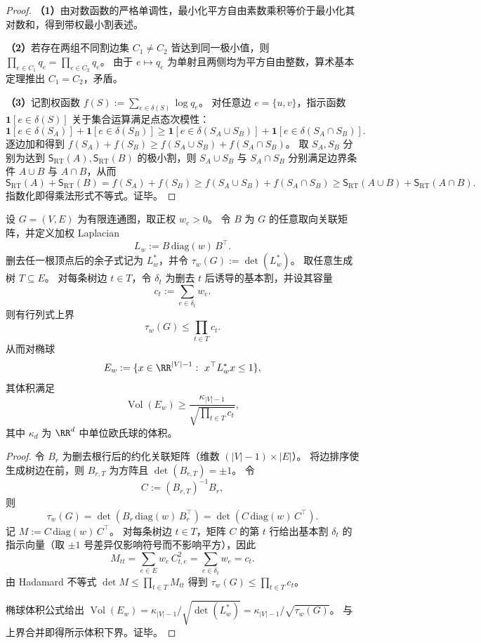 \begin{proof}
\textbf{（1）}由对数函数的严格单调性，最小化平方自由素数乘积等价于最小化其对数和，得到带权最小割表述。
\par
\textbf{（2）}若存在两组不同割边集 \(C_1\neq C_2\) 皆达到同一极小值，则
\(
\prod_{e\in C_1}q_e=\prod_{e\in C_2}q_e
\)。
由于 \(e\mapsto q_e\) 为单射且两侧均为平方自由整数，算术基本定理推出 \(C_1=C_2\)，矛盾。
\par
\textbf{（3）}记割权函数
\(
f(S):=\sum_{e\in\delta(S)}\log q_e
\)。
对任意边 \(e=\{u,v\}\)，指示函数 \(\mathbf 1[e\in\delta(S)]\) 关于集合运算满足点态次模性：
\[
\mathbf 1[e\in\delta(S_A)]+\mathbf 1[e\in\delta(S_B)]
\ge
\mathbf 1[e\in\delta(S_A\cup S_B)]+\mathbf 1[e\in\delta(S_A\cap S_B)].
\]
逐边加和得到 \(f(S_A)+f(S_B)\ge f(S_A\cup S_B)+f(S_A\cap S_B)\)。
取 \(S_A,S_B\) 分别为达到 \(\mathsf S_{\mathrm{RT}}(A),\mathsf S_{\mathrm{RT}}(B)\) 的极小割，则 \(S_A\cup S_B\) 与 \(S_A\cap S_B\) 分别满足边界条件 \(A\cup B\) 与 \(A\cap B\)，从而
\[
\mathsf S_{\mathrm{RT}}(A)+\mathsf S_{\mathrm{RT}}(B)
=f(S_A)+f(S_B)
\ge f(S_A\cup S_B)+f(S_A\cap S_B)
\ge \mathsf S_{\mathrm{RT}}(A\cup B)+\mathsf S_{\mathrm{RT}}(A\cap B).
\]
指数化即得乘法形式不等式。证毕。
\end{proof}

\begin{proposition}\label{prop:spg-kirchhoff-fundamental-cut-capacity-hadamard}
设 \(G=(V,E)\) 为有限连通图，取正权 \(w_e>0\)。
令 \(B\) 为 \(G\) 的任意取向关联矩阵，并定义加权 Laplacian
\[
L_w:=B\,\mathrm{diag}(w)\,B^\top .
\]
删去任一根顶点后的余子式记为 \(L_w^\ast\)，并令
\(
\tau_w(G):=\det(L_w^\ast)
\)。
取任意生成树 \(T\subseteq E\)。
对每条树边 \(t\in T\)，令 \(\delta_t\) 为删去 \(t\) 后诱导的基本割，并设其容量
\[
c_t:=\sum_{e\in\delta_t} w_e.
\]
则有行列式上界
\[
\tau_w(G)\le \prod_{t\in T} c_t.
\]
从而对椭球
\[
E_w:=\{x\in\RR^{|V|-1}:\ x^\top L_w^\ast x\le 1\},
\]
其体积满足
\[
\operatorname{Vol}(E_w)\ge \frac{\kappa_{|V|-1}}{\sqrt{\prod_{t\in T} c_t}},
\]
其中 \(\kappa_d\) 为 \(\RR^d\) 中单位欧氏球的体积。
\end{proposition}
\begin{proof}
令 \(B_r\) 为删去根行后的约化关联矩阵（维数 \((|V|-1)\times |E|\)）。
将边排序使生成树边在前，则 \(B_{r,T}\) 为方阵且 \(\det(B_{r,T})=\pm1\)。
令
\[
C:=(B_{r,T})^{-1}B_r,
\]
则
\[
\tau_w(G)=\det(B_r\,\mathrm{diag}(w)\,B_r^\top)=\det(C\,\mathrm{diag}(w)\,C^\top).
\]
记 \(M:=C\,\mathrm{diag}(w)\,C^\top\)。
对每条树边 \(t\in T\)，矩阵 \(C\) 的第 \(t\) 行给出基本割 \(\delta_t\) 的指示向量（取 \(\pm1\) 号差异仅影响符号而不影响平方），因此
\[
M_{tt}=\sum_{e\in E} w_e\,C_{t,e}^2=\sum_{e\in\delta_t} w_e=c_t.
\]
由 Hadamard 不等式 \(\det M\le \prod_{t\in T} M_{tt}\) 得到 \(\tau_w(G)\le \prod_{t\in T} c_t\)。
\par
椭球体积公式给出
\(
\operatorname{Vol}(E_w)=\kappa_{|V|-1}/\sqrt{\det(L_w^\ast)}=\kappa_{|V|-1}/\sqrt{\tau_w(G)}
\)。
与上界合并即得所示体积下界。证毕。
\end{proof}

\endinput

